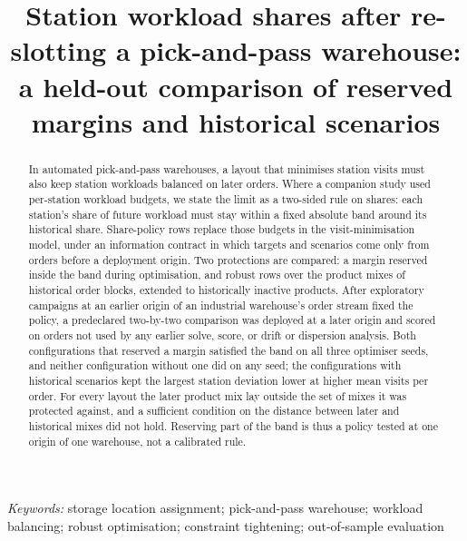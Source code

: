 \documentclass[11pt]{article}
\title{Station workload shares after re-slotting a pick-and-pass warehouse: a held-out comparison of reserved margins and historical scenarios}
\author{\authorreview{author list and affiliations}}
\date{}
\begin{document}
\maketitle

\begin{abstract}
In automated pick-and-pass warehouses, a layout that minimises station visits must also keep station workloads balanced on later orders. Where a companion study used per-station workload budgets, we state the limit as a two-sided rule on shares: each station's share of future workload must stay within a fixed absolute band around its historical share. Share-policy rows replace those budgets in the visit-minimisation model, under an information contract in which targets and scenarios come only from orders before a deployment origin. Two protections are compared: a margin reserved inside the band during optimisation, and robust rows over the product mixes of historical order blocks, extended to historically inactive products. After exploratory campaigns at an earlier origin of an industrial warehouse's order stream fixed the policy, a predeclared two-by-two comparison was deployed at a later origin and scored on orders not used by any earlier solve, score, or drift or dispersion analysis. Both configurations that reserved a margin satisfied the band on all three optimiser seeds, and neither configuration without one did on any seed; the configurations with historical scenarios kept the largest station deviation lower at higher mean visits per order. For every layout the later product mix lay outside the set of mixes it was protected against, and a sufficient condition on the distance between later and historical mixes did not hold. Reserving part of the band is thus a policy tested at one origin of one warehouse, not a calibrated rule.
\end{abstract}

\noindent\textit{Keywords:} storage location assignment; pick-and-pass warehouse; workload balancing; robust optimisation; constraint tightening; out-of-sample evaluation









\end{document}
